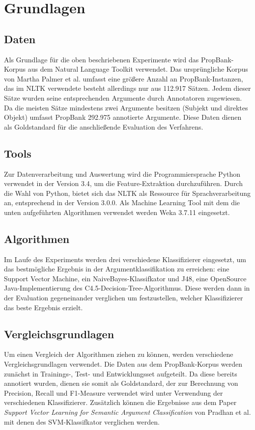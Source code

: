 \documentclass[runningheads]{llncs}
\begin{document}
\section{Grundlagen}

\subsection{Daten}

Als Grundlage f\"ur die oben beschriebenen Experimente wird das PropBank-Korpus aus dem Natural Language Toolkit verwendet. Das urspr\"ungliche Korpus von Martha Palmer et al. \cite{Palmer} umfasst eine gr\"o{\ss}ere Anzahl an PropBank-Instanzen, das im NLTK verwendete besteht allerdings nur aus 112.917 S\"atzen. 
Jedem dieser Sätze wurden seine entsprechenden Argumente durch Annotatoren zugewiesen. Da die meisten S\"atze mindestens zwei Argumente besitzen (Subjekt und direktes Objekt) umfasst PropBank 292.975 annotierte Argumente. Diese Daten dienen als Goldstandard f\"ur die anschlie{\ss}ende Evaluation des Verfahrens.



\subsection{Tools}
Zur Datenverarbeitung und Auswertung wird die Programmiersprache Python verwendet in der Version 3.4, um die Feature-Extraktion durchzuf\"uhren. Durch die Wahl von Python, bietet sich das NLTK als Ressource f\"ur Sprachverarbeitung an, entsprechend in der Version 3.0.0. Als Machine Learning Tool mit dem die unten aufgef\"uhrten
Algorithmen verwendet werden Weka 3.7.11 eingesetzt.

\subsection{Algorithmen}
Im Laufe des Experiments werden drei verschiedene Klassifizierer eingesetzt, um das bestm\"ogliche Ergebnis in der Argumentklassifikation zu erreichen: eine Support Vector
Machine, ein NaiveBayes-Klassifkator und J48, eine OpenSource Java-Implementierung des C4.5-Decision-Tree-Algorithmus. Diese werden dann in der Evaluation gegeneinander 
verglichen um festzustellen, welcher Klassifizierer das beste Ergebnis erzielt. 

\subsection{Vergleichsgrundlagen}
Um einen Vergleich der Algorithmen ziehen zu k\"onnen, werden verschiedene Vergleichsgrundlagen verwendet. Die Daten aus dem PropBank-Korpus werden zun\"achst in Trainings-, Test- und 
Entwicklungsset aufgeteilt. Da diese bereits annotiert wurden, dienen sie somit als Goldstandard, der zur Berechnung von Precision, Recall und F1-Measure verwendet wird unter Verwendung
der verschiedenen Klassifizierer. Zus\"atzlich k\"onnen die Ergebnisse aus dem Paper \textit{Support Vector Learning for Semantic Argument Classiﬁcation} von Pradhan et al. mit denen des SVM-Klassifkator verglichen werden.
\end{document}
